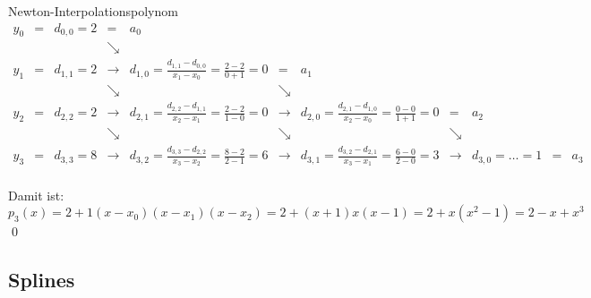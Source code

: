 \begin{example}{Newton-Interpolationspolynom}
    {
    \footnotesize
    \[
        \begin{array}{llllllllllll}
            y_0 & = & d_{0,0} = 2 & =           & a_0                                                                                                                                                                                                              \\
                &   &             & \searrow                                                                                                                                                                                                                       \\
            y_1 & = & d_{1,1} = 2 & \rightarrow & d_{1,0} = \frac{d_{1,1} - d_{0,0}}{x_1 - x_0} = \frac{2 - 2}{0 + 1} = 0 & =           & a_1                                                                                                                      \\
                &   &             & \searrow    &                                                                         & \searrow                                                                                                                               \\
            y_2 & = & d_{2,2} = 2 & \rightarrow & d_{2,1} = \frac{d_{2,2} - d_{1,1}}{x_2 - x_1} = \frac{2 - 2}{1 - 0} = 0 & \rightarrow & d_{2,0} = \frac{d_{2,1} - d_{1,0}}{x_2 - x_0} = \frac{0 - 0}{1 + 1} = 0  & =           & a_2                             \\
                &   &             & \searrow    &                                                                         & \searrow    &                                                                          & \searrow                                      \\
            y_3 & = & d_{3,3} = 8 & \rightarrow & d_{3,2} = \frac{d_{3,3} - d_{2,2}}{x_3 - x_2} = \frac{8 - 2}{2 - 1} = 6 & \rightarrow & d_{3, 1} = \frac{d_{3,2} - d_{2,1}}{x_3 - x_1} = \frac{6 - 0}{2 - 0} = 3 & \rightarrow & d_{3, 0} = \ldots = 1 & = & a_3 \\
        \end{array}
    \]
    }
    
    Damit ist: 
    \[ 
        p_3(x) = 2 + 1 (x - x_0) (x - x_1) (x - x_2) = 2 + (x+1) x (x-1) = 2 + x(x^2 - 1) = 2 - x + x^3
    \]
    \qed
\end{example}

\subsection{Splines}

